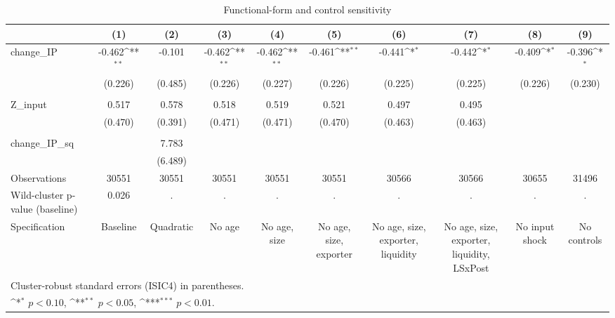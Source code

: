 \begin{table}[htbp]
\centering
\def\sym#1{\ifmmode^{#1}\else\(^{#1}\)\fi}
\caption{Functional-form and control sensitivity}
\label{tab:rob12_fe}
\small
\setlength{\tabcolsep}{4pt}
\renewcommand{\arraystretch}{1.12}
\begin{tabular}{l*{9}{c}}
\hline\hline
            &\multicolumn{1}{c}{(1)}&\multicolumn{1}{c}{(2)}&\multicolumn{1}{c}{(3)}&\multicolumn{1}{c}{(4)}&\multicolumn{1}{c}{(5)}&\multicolumn{1}{c}{(6)}&\multicolumn{1}{c}{(7)}&\multicolumn{1}{c}{(8)}&\multicolumn{1}{c}{(9)}\\
\hline
change\_IP    &      -0.462\sym{**} &      -0.101         &      -0.462\sym{**} &      -0.462\sym{**} &      -0.461\sym{**} &      -0.441\sym{*}  &      -0.442\sym{*}  &      -0.409\sym{*}  &      -0.396\sym{*}  \\
             &     (0.226)         &     (0.485)         &     (0.226)         &     (0.227)         &     (0.226)         &     (0.225)         &     (0.225)         &     (0.226)         &     (0.230)         \\
\\[0.6em]
Z\_input      &       0.517         &       0.578         &       0.518         &       0.519         &       0.521         &       0.497         &       0.495         &                     &                     \\
             &     (0.470)         &     (0.391)         &     (0.471)         &     (0.471)         &     (0.470)         &     (0.463)         &     (0.463)         &                     &                     \\
\\[0.6em]
change\_IP\_sq &                     &       7.783         &                     &                     &                     &                     &                     &                     &                     \\
             &                     &     (6.489)         &                     &                     &                     &                     &                     &                     &                     \\
\hline
Observations  &      30551          &      30551          &      30551          &      30551          &      30551          &      30566          &      30566          &      30655          &      31496          \\
Wild-cluster p-value (baseline) & 0.026 & . & . & . & . & . & . & . & . \\
Specification & Baseline & Quadratic & No age & No age, size & No age, size, exporter & No age, size, exporter, liquidity & No age, size, exporter, liquidity, LSxPost & No input shock & No controls \\
\hline\hline
\multicolumn{10}{l}{\footnotesize Cluster-robust standard errors (ISIC4) in parentheses.}\\
\multicolumn{10}{l}{\footnotesize \sym{*} \(p<0.10\), \sym{**} \(p<0.05\), \sym{***} \(p<0.01\).}\\
\end{tabular}
\end{table}

